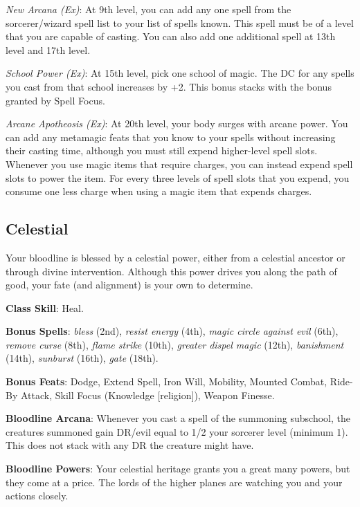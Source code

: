 \textit{New Arcana (Ex)}: At 9th level, you can add any one spell from the sorcerer/wizard spell list to your list of spells known.
This spell must be of a level that you are capable of casting. You can also add one additional spell at 13th level and 17th level.
				
\textit{School Power (Ex)}: At 15th level, pick one school of magic. The DC for any spells you cast from that school increases by +2.
This bonus stacks with the bonus granted by Spell Focus.
				
\textit{Arcane Apotheosis (Ex)}: At 20th level, your body surges with arcane power. You can add any metamagic feats that you know
to your spells without increasing their casting time, although you must still expend higher-level spell slots. Whenever you use magic
items that require charges, you can instead expend spell slots to power the item. For every three levels of spell slots that you
expend, you consume one less charge when using a magic item that expends charges.
				
\subsection{Celestial}

				
Your bloodline is blessed by a celestial power, either from a celestial ancestor or through divine intervention. Although this power
drives you along the path of good, your fate (and alignment) is your own to determine.
				
\textbf{Class Skill}: Heal.
				
\textbf{Bonus Spells}: \textit{bless} (2nd), \textit{resist energy }(4th), \textit{magic circle against evil} (6th),
\textit{remove curse} (8th),\textit{ flame strike} (10th), \textit{greater dispel magic} (12th), \textit{banishment} (14th),
\textit{sunburst} (16th),\textit{ gate }(18th).
				
\textbf{Bonus Feats}: Dodge, Extend Spell, Iron Will, Mobility, Mounted Combat, Ride-By Attack, 
Skill Focus (Knowledge \mbox{$[$}religion\mbox{$]$}), Weapon Finesse.
				
\textbf{Bloodline Arcana}: Whenever you cast a spell of the summoning subschool, the creatures summoned gain DR/evil equal to 1/2
your sorcerer level (minimum 1). This does not stack with any DR the creature might have.
				
\textbf{Bloodline Powers}: Your celestial heritage grants you a great many powers, but they come at a price. The lords of the
higher planes are watching you and your actions closely.
				
